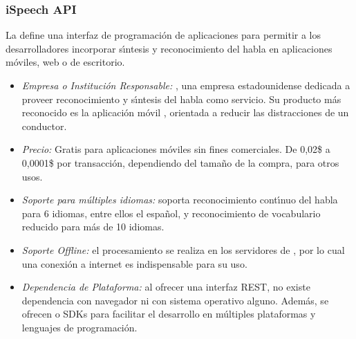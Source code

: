 \subsubsection{iSpeech API}
\label{sec:ispeech}

La  \cite{iSpeech} define una interfaz de programaci\'on de aplicaciones para permitir
a los desarrolladores incorporar s{\'\i}ntesis y reconocimiento del habla en aplicaciones m\'oviles,
web o de escritorio.

\begin{itemize}
	\item \emph{Empresa o Instituci\'on Responsable:} , una empresa estadounidense dedicada a
	proveer reconocimiento y s{\'\i}ntesis del habla como servicio. Su producto m\'as reconocido es la aplicaci\'on m\'ovil
	, orientada a reducir las distracciones de un conductor.
	\item \emph{Precio:} Gratis para aplicaciones m\'oviles sin fines comerciales. De 0,02\$ a 0,0001\$ por
	transacci\'on, dependiendo del tama\~no de la compra, para otros usos.
	\item \emph{Soporte para m\'ultiples idiomas:} soporta reconocimiento cont{\'\i}nuo del habla para 6 idiomas,
	entre ellos el espa\~nol, y reconocimiento de vocabulario reducido para m\'as de 10 idiomas.
	\item \emph{Soporte Offline:} el procesamiento se realiza en los servidores de , por lo cual
	una conexi\'on a internet es indispensable para su uso.
	\item \emph{Dependencia de Plataforma:} al ofrecer una interfaz REST, no existe dependencia con navegador
	ni con sistema operativo alguno. Adem\'as, se ofrecen  o SDKs para facilitar
	el desarrollo en m\'ultiples plataformas y lenguajes de programaci\'on.
\end{itemize}